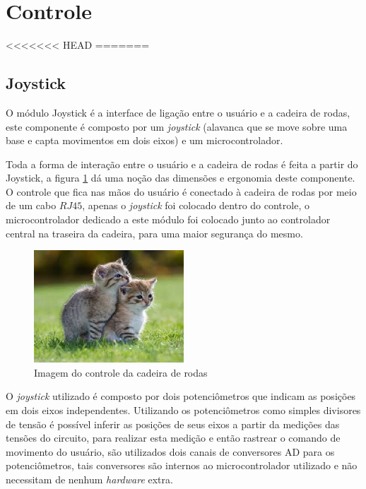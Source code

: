 \section{Controle}

<<<<<<< HEAD
=======
\subsection{Joystick}

O módulo Joystick é a interface de ligação entre o usuário e a cadeira de rodas, este componente é composto por um \textit{joystick} (alavanca que se move sobre uma base e capta movimentos em dois eixos) e um microcontrolador.

Toda a forma de interação entre o usuário e a cadeira de rodas é feita a partir do Joystick, a figura \ref{fig:joy_hand_control} dá uma noção das dimensões e ergonomia deste componente. O controle que fica nas mãos do usuário é conectado à cadeira de rodas por meio de um cabo $RJ45$, apenas o \textit{joystick} foi colocado dentro do controle, o microcontrolador dedicado a este módulo foi colocado junto ao controlador central na traseira da cadeira, para uma maior segurança do mesmo.

\begin{figure}[!htb]
\centering
\includegraphics[width = 0.5\textwidth]{figuras/resultados/joy_hand_control}
\caption{Imagem do controle da cadeira de rodas}
\label{fig:joy_hand_control}
\end{figure}

O \textit{joystick} utilizado é composto por dois potenciômetros que indicam as posições em dois eixos independentes. Utilizando os potenciômetros como simples divisores de tensão é possível inferir as posições de seus eixos a partir da medições das tensões do circuito, para realizar esta medição e então rastrear o comando de movimento do usuário, são utilizados dois canais de conversores AD para os potenciômetros, tais conversores são internos ao microcontrolador utilizado e não necessitam de nenhum \textit{hardware} extra.


